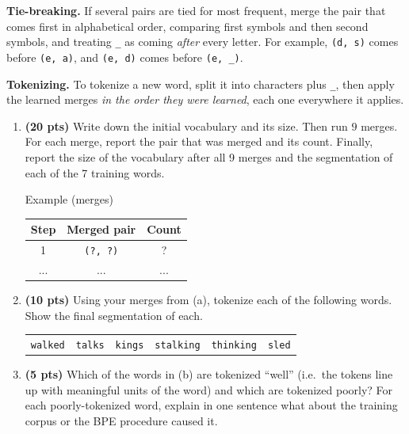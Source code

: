 \documentclass[11pt]{article}
\newcommand{\wrd}[1]{\texttt{#1}}
\newcommand{\eow}{\texttt{\_}}
\begin{document}
\medskip\noindent
\textbf{Tie-breaking.} If several pairs are tied for most frequent, merge the pair that comes first in alphabetical
order, comparing first symbols and then second symbols, and treating \eow{} as coming \emph{after} every letter.
For example, \wrd{(d, s)} comes before \wrd{(e, a)}, and \wrd{(e, d)} comes before \wrd{(e, \eow)}.

\medskip\noindent
\textbf{Tokenizing.} To tokenize a new word, split it into characters plus \eow{}, then apply the learned merges
\emph{in the order they were learned}, each one everywhere it applies.

\begin{enumerate}[label=(\alph*)]

  \item \textbf{(20 pts)} Write down the initial vocabulary and its size. Then run $9$ merges. For each merge,
  report the pair that was merged and its count. Finally, report the size of the vocabulary after all 9 merges and
  the segmentation of each of the 7 training words.

  Example (merges)

  \begin{table}[H]
      \centering
      \begin{tabular}{c|c|c}
      \toprule
      Step & Merged pair & Count \\
      \midrule
      1 & \wrd{(?, ?)} & ? \\
      ... & ... & ... \\
      \bottomrule
      \end{tabular}
  \end{table}

  \item \textbf{(10 pts)} Using your merges from (a), tokenize each of the following words. Show the
  final segmentation of each.
  \begin{center}
  \begin{tabular}{llllll}
  \wrd{walked} & \wrd{talks} & \wrd{kings} & \wrd{stalking} & \wrd{thinking} & \wrd{sled}
  \end{tabular}
  \end{center}

  \item \textbf{(5 pts)} Which of the words in (b) are tokenized ``well'' (i.e.\ the tokens line up with meaningful
  units of the word) and which are tokenized poorly? For each poorly-tokenized word, explain in one sentence what
  about the training corpus or the BPE procedure caused it.


\end{enumerate}
\end{document}
